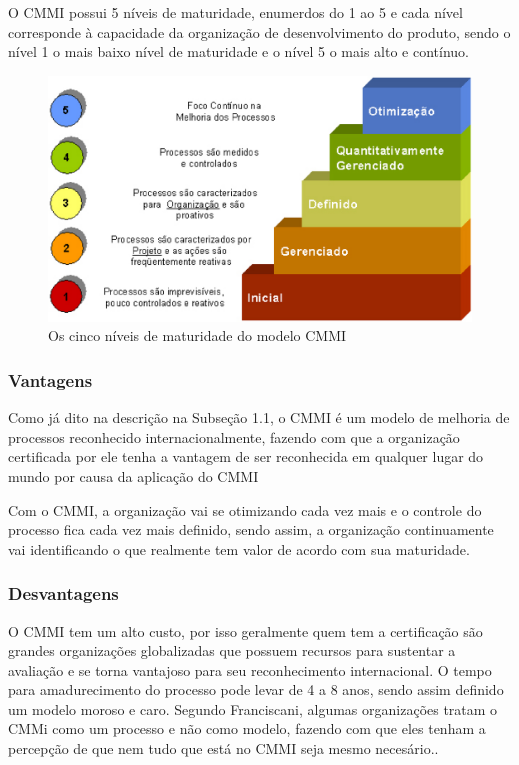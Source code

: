     O CMMI possui 5 níveis de maturidade, enumerdos do 1 ao 5 e cada nível corresponde
    à capacidade da organização de desenvolvimento do produto, sendo o nível 1 o mais
    baixo nível de maturidade e o nível 5 o mais alto e contínuo.

    \begin{figure}[!ht]
      \centering
      \includegraphics[width=15cm, keepaspectratio=true]{figuras/maturidade/niveis-cmmi.eps}
      \caption{Os cinco níveis de maturidade do modelo CMMI}
    \end{figure}

  \subsubsection{Vantagens}

    Como já dito na descrição na Subseção 1.1, o CMMI é um modelo de melhoria
    de processos reconhecido internacionalmente, fazendo com que a organização
    certificada por ele tenha a vantagem de ser reconhecida em qualquer lugar
    do mundo por causa da aplicação do CMMI

    Com o CMMI, a organização vai se otimizando cada vez mais e o controle do
    processo fica cada vez mais definido, sendo assim, a organização continuamente
    vai identificando o que realmente tem valor de acordo com sua maturidade.

  \subsubsection{Desvantagens}

    O CMMI tem um alto custo, por isso geralmente quem tem a certificação são
    grandes organizações globalizadas que possuem recursos para sustentar a
    avaliação e se torna vantajoso para seu reconhecimento internacional. O
    tempo para amadurecimento do processo pode levar de 4 a 8 anos, sendo assim
    definido um modelo moroso e caro. Segundo Franciscani, algumas organizações
    tratam o CMMi como um processo e não como modelo, fazendo com que eles tenham
    a percepção de que nem tudo que está no CMMI seja mesmo necesário.\cite{francis2012}.

